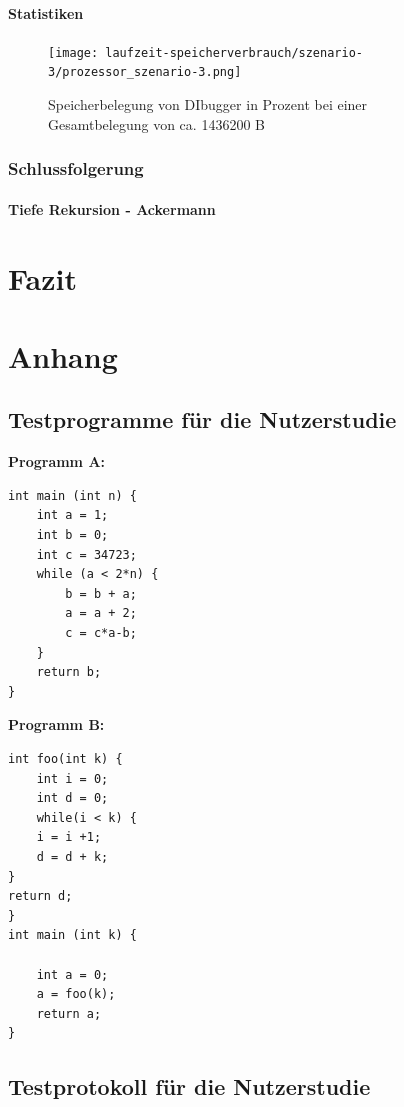 \documentclass[parskip=full]{scrartcl}
\begin{document}
        \paragraph{Statistiken}
        \begin{figure}[!h]
            \centering
            \texttt{[image: laufzeit-speicherverbrauch/szenario-3/prozessor\_szenario-3.png]}
            \caption{Speicherbelegung von DIbugger in Prozent bei einer Gesamtbelegung von ca. 1436200 B}
        \end{figure}   
    \subsubsection{Schlussfolgerung}

\paragraph{Tiefe Rekursion - Ackermann}

\newpage
\section{Fazit}



\newpage

\printglossary[style=altlist, toctitle=Glossar]
\newpage

\section{Anhang}
\subsection{Testprogramme für die Nutzerstudie}\label{code}
\textbf{Programm A:}
\begin{verbatim}
int main (int n) {
	int a = 1;
	int b = 0;
	int c = 34723;
	while (a < 2*n) {
		b = b + a;
		a = a + 2;
		c = c*a-b;
	}
	return b;
}
\end{verbatim}

\textbf{Programm B:}
\begin{verbatim}
int foo(int k) {
	int i = 0;
	int d = 0;
	while(i < k) {
	i = i +1;
	d = d + k;
}
return d;
}
int main (int k) {

	int a = 0;
	a = foo(k);
	return a;
}
\end{verbatim}

\subsection{Testprotokoll für die Nutzerstudie}\label{usertest}


\end{document}
